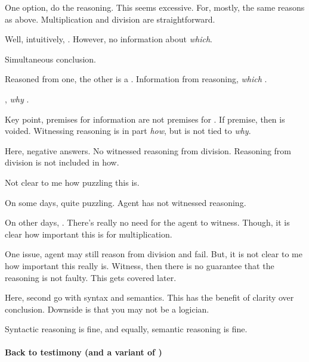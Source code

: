 \begin{note}
  One option, do the reasoning.
  This seems excessive.
  For, mostly, the same reasons as above.
  Multiplication and division are straightforward.
\end{note}

\begin{note}[\fc{0} prior]
  Well, intuitively, .
  However, no information about \emph{which}.
\end{note}

\begin{note}[Simultaneous]
  Simultaneous conclusion.

  Reasoned from one, the other is a .
  Information from reasoning, \emph{which} .

  , \emph{why} \zS{}.

  Key point, premises for information are not premises for .
  If premise, then \zS{} is voided.
  Witnessing reasoning is in part \emph{how}, but is not tied to \emph{why}.

  Here, negative answers.
  No witnessed reasoning from division.
  Reasoning from division is not included in how.
\end{note}

\begin{note}
  Not clear to me how puzzling this is.

  On some days, quite puzzling.
  Agent has not witnessed reasoning.

  On other days, .
  There's really no need for the agent to witness.
  Though, it is clear how important this is for multiplication.
\end{note}

\begin{note}
  One issue, agent may still reason from division and fail.
  But, it is not clear to me how important this really is.
  Witness, then there is no guarantee that the reasoning is not faulty.
  This gets covered later.
\end{note}

\begin{note}
  Here, second go with syntax and semantics.
  This has the benefit of clarity over conclusion.
  Downside is that you may not be a logician.

  Syntactic reasoning is fine, and equally, semantic reasoning is fine.
\end{note}

\paragraph*{Back to testimony (and a variant of \zS{})}

